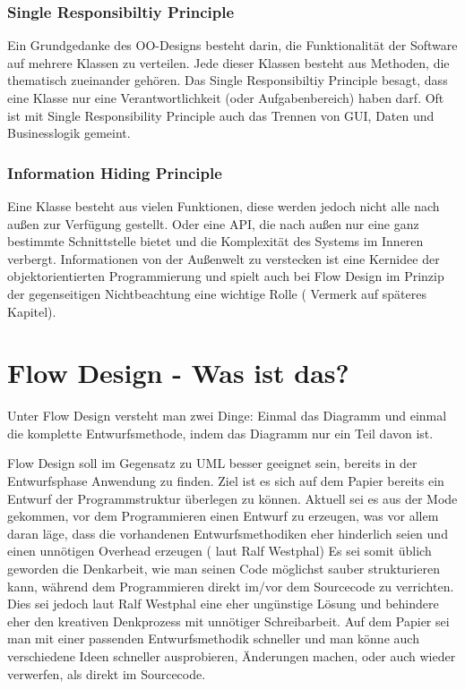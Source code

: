 \subsubsection{Single Responsibiltiy Principle}

Ein Grundgedanke des OO-Designs besteht darin, die Funktionalität der Software auf mehrere
Klassen zu verteilen. Jede dieser Klassen besteht aus Methoden, die thematisch zueinander gehören. 
Das Single Responsibiltiy Principle besagt, dass eine Klasse nur eine
Verantwortlichkeit (oder Aufgabenbereich) haben darf.
Oft ist mit Single Responsibility Principle auch das Trennen von
GUI, Daten und Businesslogik gemeint.

\subsubsection{Information Hiding Principle}

Eine Klasse besteht aus vielen Funktionen, diese werden jedoch nicht alle nach
außen zur Verfügung gestellt.
Oder eine API, die nach außen nur eine ganz bestimmte Schnittstelle bietet und
die Komplexität des Systems im Inneren verbergt. Informationen von der
Außenwelt zu verstecken ist eine Kernidee der objektorientierten Programmierung
und spielt auch bei Flow Design im Prinzip der gegenseitigen Nichtbeachtung
eine wichtige Rolle ( Vermerk auf späteres Kapitel).



\section{Flow Design - Was ist das?}

Unter Flow Design versteht man zwei Dinge:
Einmal das Diagramm und einmal die komplette Entwurfsmethode, indem das
Diagramm nur ein Teil davon ist.

Flow Design soll im Gegensatz zu UML besser geeignet sein, bereits in der Entwurfsphase Anwendung zu finden.
Ziel ist es sich auf dem Papier bereits ein Entwurf der Programmstruktur überlegen zu können.
Aktuell sei es aus der Mode gekommen, vor dem Programmieren einen Entwurf zu erzeugen, was vor allem daran läge, dass die vorhandenen
Entwurfsmethodiken eher hinderlich seien und einen unnötigen Overhead erzeugen ( laut Ralf Westphal)
Es sei somit üblich geworden die Denkarbeit, wie man seinen Code möglichst sauber strukturieren kann,
während dem Programmieren direkt im/vor dem Sourcecode zu verrichten.
Dies sei jedoch laut Ralf Westphal eine eher ungünstige Lösung und behindere eher den kreativen Denkprozess mit
unnötiger Schreibarbeit.
Auf dem Papier sei man mit einer passenden Entwurfsmethodik schneller und man könne auch verschiedene Ideen schneller
ausprobieren, Änderungen machen, oder auch wieder verwerfen, als direkt im Sourcecode.

